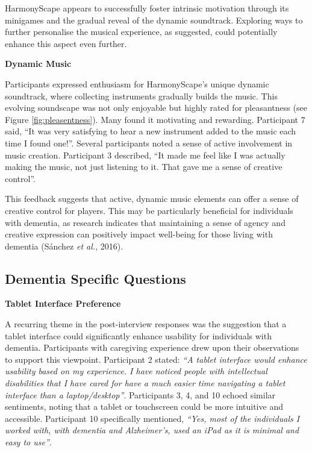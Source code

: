 \documentclass{l4proj}
\begin{document}
HarmonyScape appears to successfully foster intrinsic motivation through its minigames and the gradual reveal of the dynamic soundtrack. Exploring ways to further personalise the musical experience, as suggested, could potentially enhance this aspect even further.
\newline

\textbf{Dynamic Music}

Participants expressed enthusiasm for HarmonyScape's unique dynamic soundtrack, where collecting instruments gradually builds the music.  This evolving soundscape was not only enjoyable but highly rated for pleasantness (see Figure \ref{fig:pleasentness}). Many found it motivating and rewarding. Participant 7 said, “It was very satisfying to hear a new instrument added to the music each time I found one!”. Several participants noted a sense of active involvement in music creation. Participant 3 described, “It made me feel like I was actually making the music, not just listening to it. That gave me a sense of creative control”.

This feedback suggests that active, dynamic music elements can offer a sense of creative control for players. This may be particularly beneficial for individuals with dementia, as research indicates that maintaining a sense of agency and creative expression can positively impact well-being for those living with dementia (Sánchez \emph{et al.}, 2016).




\subsection{Dementia Specific Questions}

\textbf{Tablet Interface Preference}

A recurring theme in the post-interview responses was the suggestion that a tablet interface could significantly enhance usability for individuals with dementia. Participants with caregiving experience drew upon their observations to support this viewpoint. Participant 2 stated: \emph{“A tablet interface would enhance usability based on my experience. I have noticed people with intellectual disabilities that I have cared for have a much easier time navigating a tablet interface than a laptop/desktop”}. Participants 3, 4, and 10 echoed similar sentiments, noting that a tablet or touchscreen could be more intuitive and accessible. Participant 10 specifically mentioned, \emph{“Yes, most of the individuals I worked with, with dementia and Alzheimer's, used an iPad as it is minimal and easy to use”}. 
\end{document}
